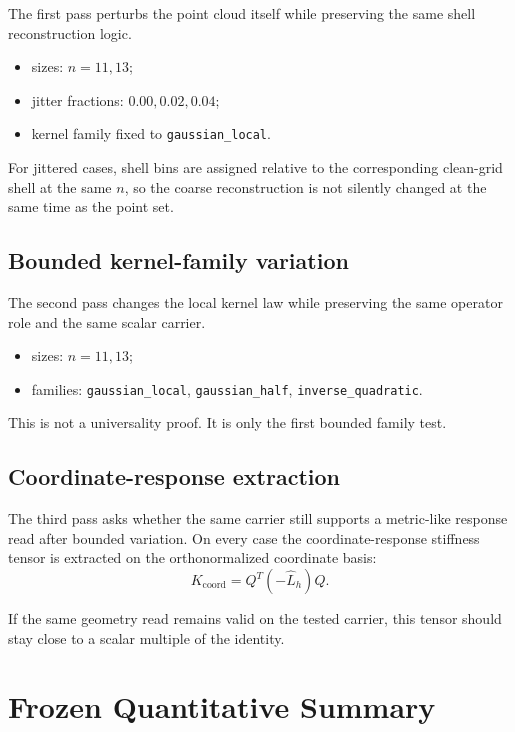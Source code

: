 \documentclass[11pt]{article}
\begin{document}
The first pass perturbs the point cloud itself while preserving the same shell reconstruction logic.

\begin{itemize}
\item sizes: \(n = 11, 13\);
\item jitter fractions: \(0.00, 0.02, 0.04\);
\item kernel family fixed to \texttt{gaussian\_local}.
\end{itemize}

For jittered cases, shell bins are assigned relative to the corresponding clean-grid shell at the same \(n\), so the coarse reconstruction is not silently changed at the same time as the point set.

\subsection{Bounded kernel-family variation}

The second pass changes the local kernel law while preserving the same operator role and the same scalar carrier.

\begin{itemize}
\item sizes: \(n = 11, 13\);
\item families: \texttt{gaussian\_local}, \texttt{gaussian\_half}, \texttt{inverse\_quadratic}.
\end{itemize}

This is not a universality proof. It is only the first bounded family test.

\subsection{Coordinate-response extraction}

The third pass asks whether the same carrier still supports a metric-like response read after bounded variation. On every case the coordinate-response stiffness tensor is extracted on the orthonormalized coordinate basis:
\[
K_{\mathrm{coord}} = Q^{T} \left(-\widehat{L}_{h}\right) Q.
\]

If the same geometry read remains valid on the tested carrier, this tensor should stay close to a scalar multiple of the identity.

\section{Frozen Quantitative Summary}
\end{document}
